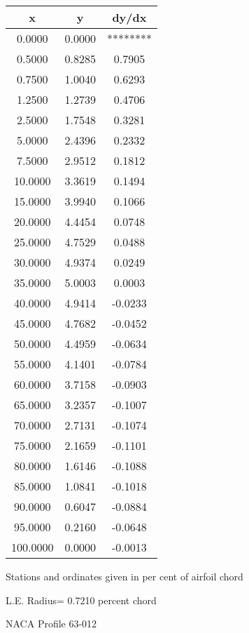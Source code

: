 \documentclass[11pt]{book}
\begin{document}
 \vspace{8mm}
 \begin{tabular}{|c|c|c|} \hline 
  x  &  y  &  dy/dx \\
 \hline
0.0000 & 0.0000 & ******** \\
0.5000 & 0.8285 & 0.7905 \\
0.7500 & 1.0040 & 0.6293 \\
1.2500 & 1.2739 & 0.4706 \\
2.5000 & 1.7548 & 0.3281 \\
5.0000 & 2.4396 & 0.2332 \\
7.5000 & 2.9512 & 0.1812 \\
10.0000 & 3.3619 & 0.1494 \\
15.0000 & 3.9940 & 0.1066 \\
20.0000 & 4.4454 & 0.0748 \\
25.0000 & 4.7529 & 0.0488 \\
30.0000 & 4.9374 & 0.0249 \\
35.0000 & 5.0003 & 0.0003 \\
40.0000 & 4.9414 & -0.0233 \\
45.0000 & 4.7682 & -0.0452 \\
50.0000 & 4.4959 & -0.0634 \\
55.0000 & 4.1401 & -0.0784 \\
60.0000 & 3.7158 & -0.0903 \\
65.0000 & 3.2357 & -0.1007 \\
70.0000 & 2.7131 & -0.1074 \\
75.0000 & 2.1659 & -0.1101 \\
80.0000 & 1.6146 & -0.1088 \\
85.0000 & 1.0841 & -0.1018 \\
90.0000 & 0.6047 & -0.0884 \\
95.0000 & 0.2160 & -0.0648 \\
100.0000 & 0.0000 & -0.0013 \\
 \hline
 \end{tabular}
 \vspace{8mm}


Stations and ordinates given in per cent of airfoil chord 


L.E. Radius=  0.7210 percent chord
 \newpage
  \label{p63-012}
 \begin{Large}
 NACA Profile 63-012
 \end{Large}
  
\end{document}
